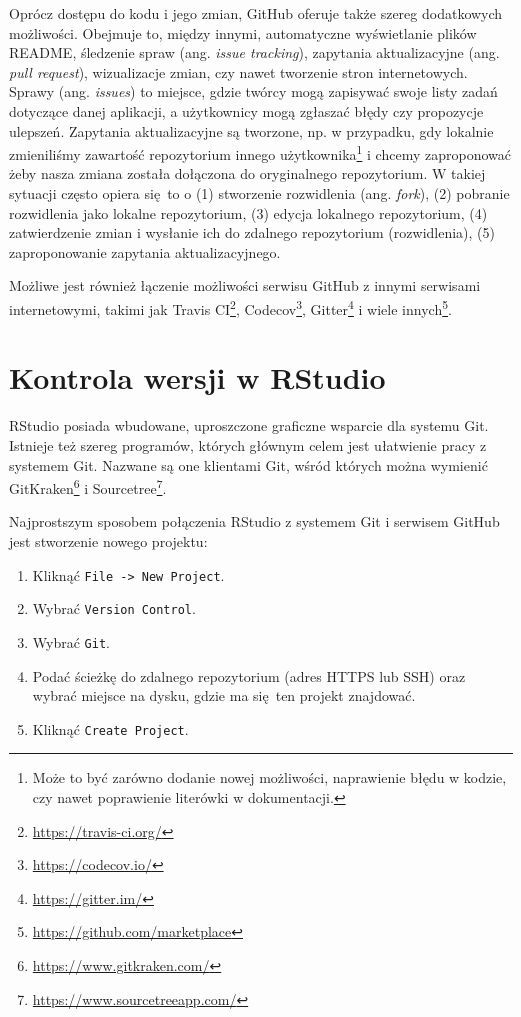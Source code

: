 \documentclass[paper=6in:9in,pagesize=pdftex,headinclude=on,footinclude=on,10pt]{scrbook}
\DeclareRobustCommand{\href}[2]{#2\footnote{\url{#1}}}
\providecommand{\tightlist}{%
  \setlength{\itemsep}{0pt}\setlength{\parskip}{0pt}}
\begin{document}
Oprócz dostępu do kodu i jego zmian, GitHub oferuje także szereg dodatkowych możliwości.
Obejmuje to, między innymi, automatyczne wyświetlanie plików README, śledzenie spraw (ang. \emph{issue tracking}), zapytania aktualizacyjne (ang. \emph{pull request}), wizualizacje zmian, czy nawet tworzenie stron internetowych.
Sprawy (ang. \emph{issues}) to miejsce, gdzie twórcy mogą zapisywać swoje listy zadań dotyczące danej aplikacji, a użytkownicy mogą zgłaszać błędy czy propozycje ulepszeń.
Zapytania aktualizacyjne są tworzone, np. w przypadku, gdy lokalnie zmieniliśmy zawartość repozytorium innego użytkownika\footnote{Może to być zarówno dodanie nowej możliwości, naprawienie błędu w kodzie, czy nawet poprawienie literówki w dokumentacji.} i chcemy zaproponować żeby nasza zmiana została dołączona do oryginalnego repozytorium.
W takiej sytuacji często opiera się~to o (1) stworzenie rozwidlenia (ang. \emph{fork}), (2) pobranie rozwidlenia jako lokalne repozytorium, (3) edycja lokalnego repozytorium, (4) zatwierdzenie zmian i wysłanie ich do zdalnego repozytorium (rozwidlenia), (5) zaproponowanie zapytania aktualizacyjnego.

Możliwe jest również łączenie możliwości serwisu GitHub z innymi serwisami internetowymi, takimi jak \href{https://travis-ci.org/}{Travis CI}, \href{https://codecov.io/}{Codecov}, \href{https://gitter.im/}{Gitter} i \href{https://github.com/marketplace}{wiele innych}.

\hypertarget{rstudio-git}{%
\section{Kontrola wersji w RStudio}\label{rstudio-git}}

RStudio posiada wbudowane, uproszczone graficzne wsparcie dla systemu Git.
Istnieje też szereg programów, których głównym celem jest ułatwienie pracy z systemem Git.
Nazwane są one klientami Git, wśród których można wymienić \href{https://www.gitkraken.com/}{GitKraken} i \href{https://www.sourcetreeapp.com/}{Sourcetree}.

Najprostszym sposobem połączenia RStudio z systemem Git i serwisem GitHub jest stworzenie nowego projektu:

\begin{enumerate}
\def\labelenumi{\arabic{enumi}.}
\tightlist
\item
  Kliknąć \texttt{File\ -\textgreater{}\ New\ Project}.
\item
  Wybrać \texttt{Version\ Control}.
\item
  Wybrać \texttt{Git}.
\item
  Podać ścieżkę do zdalnego repozytorium (adres HTTPS lub SSH) oraz wybrać miejsce na dysku, gdzie ma się~ten projekt znajdować.
\item
  Kliknąć \texttt{Create\ Project}.
\end{enumerate}
\end{document}
